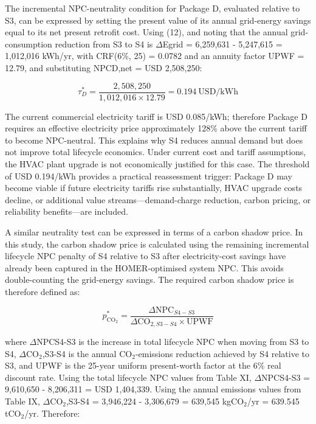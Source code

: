 \documentclass[journal,fleqn]{IEEEtran}
\begin{document}
The incremental NPC-neutrality condition for Package D, evaluated relative to S3, can be expressed by setting the present value of its annual grid-energy savings equal to its net present retrofit cost. Using (12), and noting that the annual grid-consumption reduction from S3 to S4 is $\Delta$Egrid = 6,259,631 - 5,247,615 = 1,012,016 kWh/yr, with CRF(6\%, 25) = 0.0782 and an annuity factor UPWF = 12.79, and substituting NPCD,net = USD 2,508,250:


\begin{equation}\label{eq:tau-d-value}\tau^{*}_{D}=\frac{2{,}508{,}250}{1{,}012{,}016\times12.79}=0.194\ \mathrm{USD/kWh}\end{equation}

The current commercial electricity tariff is USD 0.085/kWh; therefore Package D requires an effective electricity price approximately 128\% above the current tariff to become NPC-neutral. This explains why S4 reduces annual demand but does not improve total lifecycle economics. Under current cost and tariff assumptions, the HVAC plant upgrade is not economically justified for this case. The threshold of USD 0.194/kWh provides a practical reassessment trigger: Package D may become viable if future electricity tariffs rise substantially, HVAC upgrade costs decline, or additional value streams---demand-charge reduction, carbon pricing, or reliability benefits---are included.


A similar neutrality test can be expressed in terms of a carbon shadow price. In this study, the carbon shadow price is calculated using the remaining incremental lifecycle NPC penalty of S4 relative to S3 after electricity-cost savings have already been captured in the HOMER-optimised system NPC. This avoids double-counting the grid-energy savings. The required carbon shadow price is therefore defined as:


\begin{equation}\label{eq:carbon-price}p^{*}_{\mathrm{CO}_{2}}=\frac{\Delta\mathrm{NPC}_{S4-S3}}{\Delta\mathrm{CO}_{2,S3-S4}\times\mathrm{UPWF}}\end{equation}

where $\Delta$NPCS4-S3 is the increase in total lifecycle NPC when moving from S3 to S4, $\Delta$CO$_{2}$,S3-S4 is the annual CO$_{2}$-emissions reduction achieved by S4 relative to S3, and UPWF is the 25-year uniform present-worth factor at the 6\% real discount rate. Using the total lifecycle NPC values from Table XI, $\Delta$NPCS4-S3 = 9,610,650 - 8,206,311 = USD 1,404,339. Using the annual emissions values from Table IX, $\Delta$CO$_{2}$,S3-S4 = 3,946,224 - 3,306,679 = 639,545 kgCO$_{2}$/yr = 639.545 tCO$_{2}$/yr. Therefore:
\end{document}
